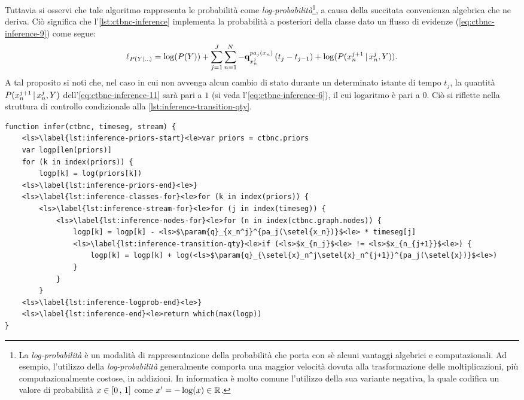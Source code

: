 Tuttavia si osservi che tale algoritmo rappresenta le probabilità come \emph{log-probabilità}\footnote{La \emph{log-probabilità} è un modalità di rappresentazione della probabilità che porta con sè alcuni vantaggi algebrici e computazionali. Ad esempio, l'utilizzo della \emph{log-probabilità} generalmente comporta una maggior velocità dovuta alla trasformazione delle moltiplicazioni, più computazionalmente costose, in addizioni. In informatica è molto comune l'utilizzo della sua variante negativa, la quale codifica un valore di probabilità $\mathnormal{x} \in [0\,,\,1]$ come $\mathnormal{x}^{\prime}=-\log(\mathnormal{x}) \in \mathbb{R}$.}, a causa della succitata convenienza algebrica che ne deriva. Ciò significa che l'\autoref{lst:ctbnc-inference} implementa la probabilità a posteriori della classe dato un flusso di evidenze (\autoref{eq:ctbnc-inference-9}) come segue:
\small
\begin{equation}\label{eq:ctbnc-inference-11}
\ell_{P(\mathnormal{Y}|\dots\negthinspace{})} = \log (P(\mathnormal{Y})) + \sum_{j=1}^{J}\sum_{n=1}^N-\boldsymbol{\textbf{\text{q}}}_{\mathnormal{x}_n^j}^{pa_j(\mathnormal{x}_n)}\,(t_j - t_{j-1}) + \log (P(\mathnormal{x}_n^{j+1}\,\arrowvert\,\mathnormal{x}_n^j,\mathnormal{Y}))\text{\normalsize .}
\end{equation}
\normalsize
A tal proposito si noti che, nel caso in cui non avvenga alcun cambio di stato durante un determinato istante di tempo $t_j$, la quantità $P(\mathnormal{x}_n^{j+1}\,\arrowvert\,\mathnormal{x}_n^j,\mathnormal{Y})$ dell'\autoref{eq:ctbnc-inference-11} sarà pari a $1$ (si veda l'\autoref{eq:ctbnc-inference-6}), il cui logaritmo è pari a $0$. Ciò si riflette nella struttura di controllo condizionale alla \autoref{lst:inference-transition-qty}.
\vspace*{8pt}\begin{lstlisting}[caption=Inferenza su un classificatore \acs{CTBN},label=lst:ctbnc-inference, language=pseudo]
function infer(ctbnc, timeseg, stream) {
    <ls>\label{lst:inference-priors-start}<le>var priors = ctbnc.priors
    var logp[len(priors)]
    for (k in index(priors)) {
        logp[k] = log(priors[k])
    <ls>\label{lst:inference-priors-end}<le>}
    <ls>\label{lst:inference-classes-for}<le>for (k in index(priors)) {
        <ls>\label{lst:inference-stream-for}<le>for (j in index(timeseg)) {
            <ls>\label{lst:inference-nodes-for}<le>for (n in index(ctbnc.graph.nodes)) {
                logp[k] = logp[k] - <ls>$\param{q}_{x_n^j}^{pa_j(\setel{x_n})}$<le> * timeseg[j]
                <ls>\label{lst:inference-transition-qty}<le>if (<ls>$x_{n_j}$<le> != <ls>$x_{n_{j+1}}$<le>) {
                    logp[k] = logp[k] + log(<ls>$\param{q}_{\setel{x}_n^j\setel{x}_n^{j+1}}^{pa_j(\setel{x})}$<le>)
                }
            }
        }
    <ls>\label{lst:inference-logprob-end}<le>}
    <ls>\label{lst:inference-end}<le>return which(max(logp))
}
\end{lstlisting}
